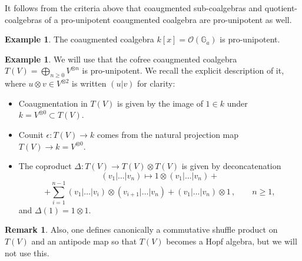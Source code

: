 \documentclass[10pt,russian]{article}
\theoremstyle{plain}
\theoremstyle{definition}
\newtheorem{rem}[theorem]{Remark}
\newtheorem{exm}[theorem]{Example}
\begin{document}
It follows from the criteria above that coaugmented sub-coalgebras and quotient-coalgebras of a pro-unipotent coaugmented coalgebra are pro-unipotent as well.
	
\begin{exm}
The coaugmented coalgebra $k[x]=\mathcal{O}(\mathbb{G}_a)$ is pro-unipotent.
\end{exm}
\begin{exm}
We will use that the cofree coaugmented coalgebra $T(V) = \bigoplus_{n \geqslant 0} V^{\otimes n}$  is pro-unipotent. We recall the explicit description of it, where $u \otimes v \in V^{\otimes 2}$ is written $(u|v)$ for clarity:
			\begin{itemize}
			\item Coaugmentation in $T(V)$ is given by the image of $1\in k$ under $k = V^{\otimes 0}\subset T(V)$.
			
			\item Counit $\epsilon\colon T(V) \to k$ comes from the natural projection map $T(V) \to k = V^{\otimes 0}$.
			
			
			
			\item The coproduct $\Delta\colon T(V) \to T(V) \otimes T(V)$ is given by deconcatenation
			$$
			(v_1| \ldots |v_n) \mapsto 1\otimes (v_1|\ldots|v_n)+
			$$
			$$
			+\sum_{i=1}^{n-1} (v_1| \ldots |v_i )\otimes (v_{i+1}| \ldots |v_n)+(v_1|\ldots|v_n)\otimes 1\,,\qquad n\geqslant 1,
			$$
			and $\Delta(1)=1\otimes 1$.
		\end{itemize}
	\end{exm}

\begin{rem}\label{rem:shufflecofree}
Also, one defines canonically a commutative shuffle product on~$T(V)$ and an antipode map so that $T(V)$ becomes a Hopf algebra, but we will not use this.
\end{rem}
\end{document}
